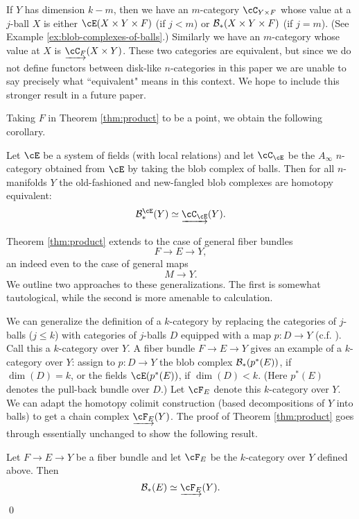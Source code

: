 
If $Y$ has dimension $k-m$, then we have an $m$-category $\cC_{Y\times F}$ whose value at
a $j$-ball $X$ is either $\cE(X\times Y\times F)$ (if $j<m$) or ${\mathcal B}_*(X\times Y\times F)$
(if $j=m$).
(See Example \ref{ex:blob-complexes-of-balls}.)
Similarly we have an $m$-category whose value at $X$ is $\cl{\cC_F}(X\times Y)$.
These two categories are equivalent, but since we do not define functors between
disk-like $n$-categories in this paper we are unable to say precisely
what ``equivalent" means in this context.
We hope to include this stronger result in a future paper.

\medskip

Taking $F$ in Theorem \ref{thm:product} to be a point, we obtain the following corollary.

\begin{cor}
\label{cor:new-old}
Let $\cE$ be a system of fields (with local relations) and let $\cC_\cE$ be the $A_\infty$
$n$-category obtained from $\cE$ by taking the blob complex of balls.
Then for all $n$-manifolds $Y$ the old-fashioned and new-fangled blob complexes are
homotopy equivalent:
\[
	\bc^\cE_*(Y) \htpy \cl{\cC_\cE}(Y) .
\]
\end{cor}

\medskip

Theorem \ref{thm:product} extends to the case of general fiber bundles
\[
	F \to E \to Y ,
\]
an indeed even to the case of general maps
\[
	M\to Y .
\]
We outline two approaches to these generalizations.
The first is somewhat tautological, while the second is more amenable to
calculation.

We can generalize the definition of a $k$-category by replacing the categories
of $j$-balls ($j\le k$) with categories of $j$-balls $D$ equipped with a map $p:D\to Y$
(c.f. \cite{MR2079378}).
Call this a $k$-category over $Y$.
A fiber bundle $F\to E\to Y$ gives an example of a $k$-category over $Y$:
assign to $p:D\to Y$ the blob complex ${\mathcal B}_*(p^*(E))$, if $\dim(D) = k$,
or the fields $\cE(p^*(E))$, if $\dim(D) < k$.
(Here $p^*(E)$ denotes the pull-back bundle over $D$.)
Let $\cF_E$ denote this $k$-category over $Y$.
We can adapt the homotopy colimit construction (based decompositions of $Y$ into balls) to
get a chain complex $\cl{\cF_E}(Y)$.
The proof of Theorem \ref{thm:product} goes through essentially unchanged 
to show the following result.
\begin{thm}
Let $F \to E \to Y$ be a fiber bundle and let $\cF_E$ be the $k$-category over $Y$ defined above.
Then
\[
	\bc_*(E) \simeq \cl{\cF_E}(Y) .
\]
\qed
\end{thm}

